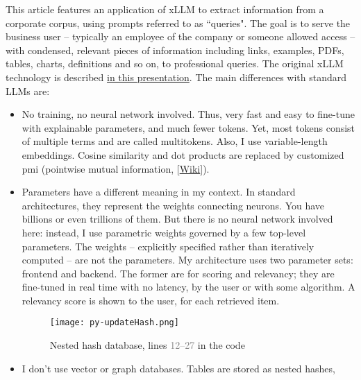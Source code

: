 \documentclass[10pt]{article}
\begin{document}
This article features an application of xLLM to extract information from a corporate corpus, using prompts referred to as ``queries". 
The goal is to serve the business user -- typically an employee of the company or someone allowed access -- with condensed, relevant pieces of information including links, examples, PDFs, tables, charts, definitions and so on,  to professional queries. The
 original xLLM technology is described \href{https://mltblog.com/3KqlNO7}{in this presentation}. 
The main differences with standard LLMs are:
\vspace{1ex}
\begin{itemize}
\item No training, no neural network involved. Thus, very fast and easy to fine-tune with explainable parameters, and much fewer
 tokens. Yet, most tokens consist of multiple terms and are called \textcolor{index}{multitokens}. Also, I use 
\textcolor{index}{variable-length embeddings}.
Cosine similarity and dot products are replaced by customized \textcolor{index}{pmi} (pointwise mutual information, [\href{https://en.wikipedia.org/wiki/Pointwise_mutual_information}{Wiki}]).
\vspace{1ex}
\item Parameters have a different meaning in my context. In standard architectures, they represent the weights connecting neurons.  You have billions or
 even trillions of them. But there is no neural network involved here: instead, I use parametric weights governed by a few top-level parameters.
 The weights -- explicitly specified rather than iteratively computed -- are not the parameters.  My architecture uses two parameter
 sets: frontend and backend. The former are for scoring and relevancy; they are fine-tuned in real time with no latency, by the user or with some algorithm. A relevancy score is shown to the user, for each retrieved item.
\vspace{1ex}
\begin{figure}[H]
\centering
\texttt{[image: py-updateHash.png]}
\caption{Nested hash database, lines \textcolor{gray}{12--27} in the code}
\label{fig:greg09ytb}
\end{figure}
\item  I don't use vector or graph databases. Tables are stored as \textcolor{index}{nested hashes}, 

\end{itemize}
\end{document}
